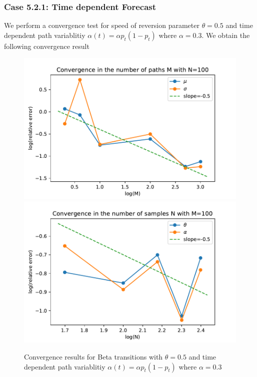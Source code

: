 \documentclass[aspectratio=169]{beamer}\usepackage[utf8]{inputenc}
\begin{document}
\begin{frame}\frametitle{ Case 5.2.1: Time dependent Forecast  }
We perform a convergence test for speed of reversion parameter $\theta = 0.5$ and time dependent path variablitiy $\alpha (t) =  \alpha p_t (1-p_t)$ where $\alpha=0.3$. We obtain the following convergence result
\begin{figure}
    \includegraphics[scale=0.4]{Figures/conv_M_beta_flex_10.pdf}
    \includegraphics[scale=0.4]{Figures/conv_N_beta_flex_35.pdf}
  \caption{ Convergence results for Beta transitions with $\theta = 0.5$ and time dependent path variablitiy $\alpha (t) =  \alpha p_t (1-p_t)$ where $\alpha=0.3$   }
\end{figure}

\end{frame}
\end{document}

